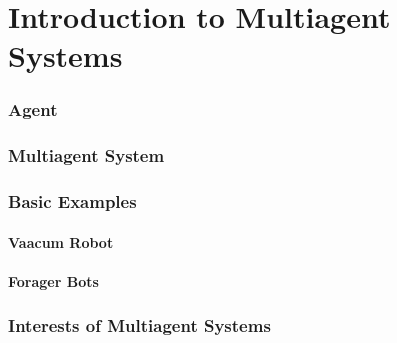 \part{Introduction to Multiagent Systems}
\begin{bibliographysection}

	\section{Agent}
	\localized

	\section{Multiagent System}
	\localized

	\section{Basic Examples}
	\subsection{Vaacum Robot}
	\localized
	\subsection{Forager Bots}
	\localized

	\section{Interests of Multiagent Systems}
	\localized

	\thanksslide
\end{bibliographysection}

